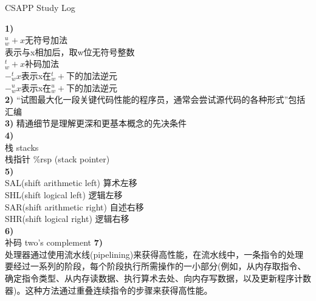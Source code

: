 \documentclass{article}
\begin{document}
\begin{CJK}{UTF8}{gkai}
\end{CJK}
\begin{CJK}{UTF8}{gbsn}
\end{CJK}
\begin{CJK}{UTF8}{uyhei}
\fontsize{40pt}{40pt}\selectfont
\centerline{CSAPP Study Log}		
\fontsize{18pt}{18pt}\selectfont
\noindent\textbf{1)}			\\
$_w^u+x$无符号加法			\\[0.5ex]
表示与x相加后，取w位无符号整数		\\[0.5ex]
$_w^t+x$补码加法			\\[0.5ex]
$-_w^tx$表示x在$^t_w+$下的加法逆元	\\[0.5ex]
$-_w^ux$表示x在$_w^u+$下的加法逆元	\\[1ex]
\textbf{2)}
``试图最大化一段关键代码性能的程序员，通常会尝试源代码的各种形式''包括汇编	\\[1ex]
\textbf{3)}
精通细节是理解更深和更基本概念的先决条件	\\[1ex]
\textbf{4)}	\\
栈	stacks	\\[1ex]
栈指针	\%rsp	(stack pointer)	\\[1ex]
\textbf{5)}	\\
SAL(shift arithmetic left)	算术左移	\\
SHL(shift logical left)		逻辑左移	\\
SAR(shift arithmetic right)	自述右移	\\
SHR(shift logical right)	逻辑右移	\\[1ex]
\textbf{6)}	\\
补码	two's complement
\textbf{7)}	\\
处理器通过使用流水线(pipelining)来获得高性能，在流水线中，一条指令的处理要经过一系列的阶段，每个阶段执行所需操作的一小部分(例如，从内存取指令、确定指令类型、从内存读数据、执行算术去处、向内存写数据，以及更新程序计数器)。这种方法通过重叠连续指令的步骤来获得高性能。





\end{CJK}
\end{document}
